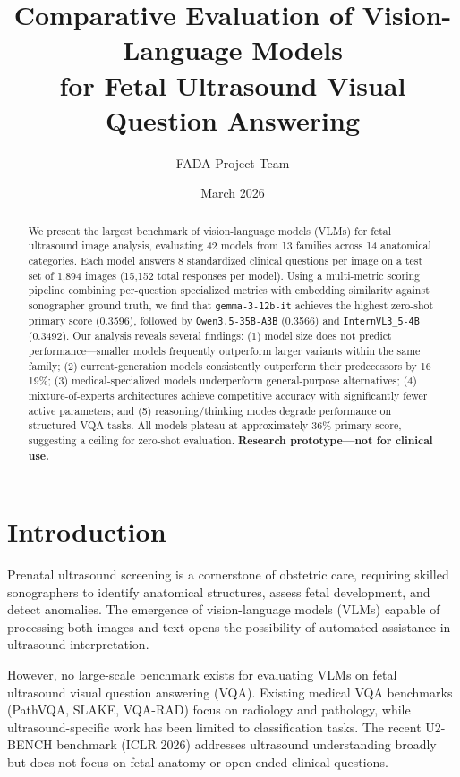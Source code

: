 \documentclass[11pt,a4paper]{article}
\title{Comparative Evaluation of Vision-Language Models\\for Fetal Ultrasound Visual Question Answering}
\author{FADA Project Team}
\date{March 2026}
\begin{document}
\maketitle

\begin{abstract}
We present the largest benchmark of vision-language models (VLMs) for fetal ultrasound image analysis, evaluating 42 models from 13 families across 14 anatomical categories. Each model answers 8 standardized clinical questions per image on a test set of 1,894 images (15,152 total responses per model). Using a multi-metric scoring pipeline combining per-question specialized metrics with embedding similarity against sonographer ground truth, we find that \texttt{gemma-3-12b-it} achieves the highest zero-shot primary score (0.3596), followed by \texttt{Qwen3.5-35B-A3B} (0.3566) and \texttt{InternVL3\_5-4B} (0.3492). Our analysis reveals several findings: (1) model size does not predict performance---smaller models frequently outperform larger variants within the same family; (2) current-generation models consistently outperform their predecessors by 16--19\%; (3) medical-specialized models underperform general-purpose alternatives; (4) mixture-of-experts architectures achieve competitive accuracy with significantly fewer active parameters; and (5) reasoning/thinking modes degrade performance on structured VQA tasks. All models plateau at approximately 36\% primary score, suggesting a ceiling for zero-shot evaluation. \textbf{Research prototype---not for clinical use.}
\end{abstract}

\section{Introduction}

Prenatal ultrasound screening is a cornerstone of obstetric care, requiring skilled sonographers to identify anatomical structures, assess fetal development, and detect anomalies. The emergence of vision-language models (VLMs) capable of processing both images and text opens the possibility of automated assistance in ultrasound interpretation.

However, no large-scale benchmark exists for evaluating VLMs on fetal ultrasound visual question answering (VQA). Existing medical VQA benchmarks (PathVQA, SLAKE, VQA-RAD) focus on radiology and pathology, while ultrasound-specific work has been limited to classification tasks. The recent U2-BENCH benchmark (ICLR 2026) addresses ultrasound understanding broadly but does not focus on fetal anatomy or open-ended clinical questions.
\end{document}
